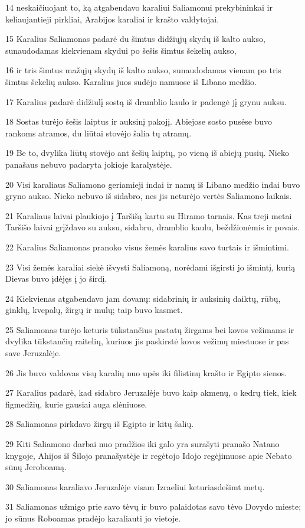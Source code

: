 \par 14 neskaičiuojant to, ką atgabendavo karaliui Saliamonui prekybininkai ir keliaujantieji pirkliai, Arabijos karaliai ir krašto valdytojai. 
\par 15 Karalius Saliamonas padarė du šimtus didžiųjų skydų iš kalto aukso, sunaudodamas kiekvienam skydui po šešis šimtus šekelių aukso, 
\par 16 ir tris šimtus mažųjų skydų iš kalto aukso, sunaudodamas vienam po tris šimtus šekelių aukso. Karalius juos sudėjo namuose iš Libano medžio. 
\par 17 Karalius padarė didžiulį sostą iš dramblio kaulo ir padengė jį grynu auksu. 
\par 18 Sostas turėjo šešis laiptus ir auksinį pakojį. Abiejose sosto pusėse buvo rankoms atramos, du liūtai stovėjo šalia tų atramų. 
\par 19 Be to, dvylika liūtų stovėjo ant šešių laiptų, po vieną iš abiejų pusių. Nieko panašaus nebuvo padaryta jokioje karalystėje. 
\par 20 Visi karaliaus Saliamono geriamieji indai ir namų iš Libano medžio indai buvo gryno aukso. Nieko nebuvo iš sidabro, nes jis neturėjo vertės Saliamono laikais. 
\par 21 Karaliaus laivai plaukiojo į Taršišą kartu su Hiramo tarnais. Kas treji metai Taršišo laivai grįždavo su auksu, sidabru, dramblio kaulu, beždžionėmis ir povais. 
\par 22 Karalius Saliamonas pranoko visus žemės karalius savo turtais ir išmintimi. 
\par 23 Visi žemės karaliai siekė išvysti Saliamoną, norėdami išgirsti jo išmintį, kurią Dievas buvo įdėjęs į jo širdį. 
\par 24 Kiekvienas atgabendavo jam dovanų: sidabrinių ir auksinių daiktų, rūbų, ginklų, kvepalų, žirgų ir mulų; taip buvo kasmet. 
\par 25 Saliamonas turėjo keturis tūkstančius pastatų žirgams bei kovos vežimams ir dvylika tūkstančių raitelių, kuriuos jis paskirstė kovos vežimų miestuose ir pas save Jeruzalėje. 
\par 26 Jis buvo valdovas visų karalių nuo upės iki filistinų krašto ir Egipto sienos. 
\par 27 Karalius padarė, kad sidabro Jeruzalėje buvo kaip akmenų, o kedrų tiek, kiek figmedžių, kurie gausiai auga slėniuose. 
\par 28 Saliamonas pirkdavo žirgų iš Egipto ir kitų šalių. 
\par 29 Kiti Saliamono darbai nuo pradžios iki galo yra surašyti pranašo Natano knygoje, Ahijos iš Šilojo pranašystėje ir regėtojo Idojo regėjimuose apie Nebato sūnų Jeroboamą. 
\par 30 Saliamonas karaliavo Jeruzalėje visam Izraeliui keturiasdešimt metų. 
\par 31 Saliamonas užmigo prie savo tėvų ir buvo palaidotas savo tėvo Dovydo mieste; jo sūnus Roboamas pradėjo karaliauti jo vietoje.



